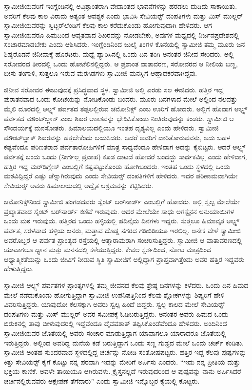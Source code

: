  ಸ್ವಾಮೀಜಿಯವರಿಗೆ ಇಂಗ್ಲೆಂಡಿನಲ್ಲಿ ಅವಿಶ್ರಾಂತರಾಗಿ ವೇದಾಂತದ ಭಾವನೆಗಳನ್ನು ಹರಡಲು ದುಡಿದು ಸಾಕಾಯಿತು. ಅವರಿಗೆ ಕೆಲವು ಕಾಲ ವಿರಾಮ ಅತ್ಯಂತ ಆವಶ್ಯಕ ಎಂದು ಭಾವಿಸಿ ಸೇವಿಯರ್ಸ್‍‍ ದಂಪತಿಗಳು ಮತ್ತು ಮಿಸ್ ಮುಲ್ಲರ್ ಸ್ವಾಮೀಜಿಯವರನ್ನು ಸ್ವಿಟ್ಜರ್‌ಲೆಂಡಿಗೆ ಕೆಲವು ಕಾಲ ಕರೆದುಕೊಂಡು ಹೋಗುವುದಾಗಿ ಹೇಳಿದರು. ಆಗ ಸ್ವಾಮೀಜಿಯವರೂ ಹಿಮದಿಂದ ಆವೃತವಾದ ಶಿಖರವನ್ನು ನೋಡಬೇಕು, ಅವುಗಳ ಮಧ್ಯದಲ್ಲಿ ನಿರ್ಜನಪ್ರದೇಶದಲ್ಲಿ ಸಂಚಾರಮಾಡಬೇಕು ಎಂದು ಆಶಿಸಿದರು. ಇಂಗ್ಲೆಂಡಿನಿಂದ ಜುಲೈ ತಿಂಗಳ ಕೊನೆಯಲ್ಲಿ ಸ್ವಾಮೀಜಿ ತಮ್ಮ ಮೂರು ಜನ ಶಿಷ್ಯರೊಡನೆ ಜಿನೀವಾಕ್ಕೆ ಹೊರಟರು. ಮಧ್ಯೆ ಪ್ಯಾರಿಸಿನಲ್ಲಿ ಒಂದು ದಿನ ತಂಗಿ ಅನಂತರ ಜಿನೀವ ಸೇರಿದರು. ಅಲ್ಲಿ ಸರೋವರದ ತೀರದಲ್ಲಿ ಒಂದು ಹೋಟೆಲಿನಲ್ಲಿದ್ದರು. ಆ ಪ್ರಶಾಂತ ವಾತಾವರಣ, ಸರೋವರದ ಆ ನೀಲಿಯ ಬಣ್ಣ, ಬೀಸು ತಂಗಾಳಿ, ಸುತ್ತಲೂ ಇರುವ ಮರಗಿಡಗಳು ಸ್ವಾಮೀಜಿ ಮನಸ್ಸಿಗೆ ಆಹ್ಲಾದಕರವಾಗಿದ್ದವು. 

 ಜಿನೀವ ಸರೋವರ ಈಜುವುದಕ್ಕೆ ಪ್ರಸಿದ್ಧವಾದ ಸ್ಥಳ. ಸ್ವಾಮೀಜಿ ಅಲ್ಲಿ ಎರಡು ಸಲ ಈಜಿದರು. ಹತ್ತಿರ ಇದ್ದ ಪುರಾತನವಾದ ಒಂದು ಕೋಟೆಯನ್ನು ನೋಡಿಕೊಂಡು ಬಂದರು. ಮೂರು ದಿನಗಳಾದ ಮೇಲೆ ಅಲ್ಲಿಂದ ನಲವತ್ತು ಮೈಲಿ ದೂರದಲ್ಲಿ ಆಲ್ಫ್ಸ್ ಪರ್ವತದ ತಪ್ಪಲಲ್ಲಿರುವ ಚಮೋನಿಕ್ಸ್ ಎಂಬ ಊರಿಗೆ ಹೋದರು. ಅಲ್ಲಿಗೆ ಹೊದಾಗ ಆಲ್ಫ್ಸ್ ಪರ್ವತದ ಮೌಂಟ್‍ಬ್ಲಾಕ್ ಎಂಬ ಶಿಖರ ಆಕಾಶವನ್ನು ಭೇದಿಸಿಕೊಂಡು ನಿಂತಿರುವುದನ್ನು ಕಂಡರು. ಸ್ವಾಮೀಜಿ ಆ ಸೌಂದರ್ಯಕ್ಕೆ ಮನಸೋತರು. ಹಿಮಾಲಯದಲ್ಲಿಯೂ ಇಂತಹ ದೃಶ್ಯವಿಲ್ಲ ಎಂದು ಹೇಳಿದರು. ಸ್ವಾಮೀಜಿ ಮೌಂಟ್‍ಬ್ಲಾಕ್ ಶಿಖರವನ್ನು ಹತ್ತಬೇಕೆಂದು ಬಯಸಿದರು. ಆದರೆ ಅವರಿಗೆ ದಾರಿತೋರುವವನು, ಅದು ಬಹಳ ಕಷ್ಟವೆಂದೂ ಪರಿಣತರಾದ ಪರ್ವತಾರೋಹಿಗಳಿಗೆ ಮಾತ್ರ ಸಾಧ್ಯವೆಂದೂ ಹೇಳಿದಾಗ ಅದನ್ನು ಕೈಬಿಟ್ಟರು. ಆದರೆ ಆಲ್ಫ್ಸ್ ಪರ್ವತಕ್ಕೆ ಬಂದು ಒಂದು (ನೀರ್ಗಲ್ಲ ಪ್ರವಾಹ) ಕೂಡ ದಾಟದೆ ಹೋದರೆ ಬಂದದ್ದು ಸಾರ್ಥಕವಿಲ್ಲ ಎಂದು ಹೇಳಿದಾಗ, ಹತ್ತಿರ ಇದ್ದ ಮರ್‌ಡಿಗ್ಲೇಸ್ ಎಂಬಲ್ಲಿಗೆ ಕಷ್ಟಪಟ್ಟುಕೊಂಡು ಹೋಗಿಬಂದರು. ಇಂತಹ ಒಂದು ಸ್ಥಳದಲ್ಲಿ ಒಂದು ಮಠವಿದ್ದಿದ್ದರೆ ಎಷ್ಟು ಚೆನ್ನಾಗಿರುವುದು ಎಂದು ಸೇವಿಯರ್ಸ್‍‍ ದಂಪತಿಗಳಿಗೆ ಹೇಳಿದರು. ಇದರ ಪರಿಣಾಮವಾಗಿಯೇ ಸೇವಿಯರ್ಸ್‍‍ ಅವರು ಹಿಮಾಲಯದಲ್ಲಿ ಅದ್ವೈತ ಆಶ್ರಮವನ್ನು ಕಟ್ಟಿಸಿದರು. 

 ಚಮೋನಿಕ್ಸ್‌ನಿಂದ ಸ್ವಾಮೀಜಿ ಪಂಗಡದವರು ಸೈಂಟ್ ಬರ್‌ನಾರ್ಡ್ ಎಂಬಲ್ಲಿಗೆ ಹೋದರು. ಅಲ್ಲಿ ಸ್ವಲ್ಪ ಮೇಲೆಯೇ ಪ್ರಖ್ಯಾತವಾದ ಸೈಂಟ್ ಬರ್‌ನಾರ್ಡ್ ಕಣಿವೆ ಇರುವುದು. ಅದರ ಮೇಲೆಯೇ ಸಾಧು ಅಗಸ್ಟೈನನ ಅನುಯಾಯಿಗಳ ಒಂದು ಮಠ ಇರುವುದು. ಹತ್ತಿರದ ಒಂದು ಹಳ್ಳಿಯಲ್ಲಿ ಹದಿನೈದು ದಿನಗಳು ಇದ್ದರು. ಸುತ್ತಲೂ ಹಿಮಾವೃತ ಆಲ್ಫ್ಸ್ ಪರ್ವತ, ಸರಳವಾದ ಹಳ್ಳಿಯ ಜನರು, ಮತ್ತಾವ ದೊಡ್ಡ ನಗರದ ಗಡಿಬಿಡಿಯೂ ಇರಲಿಲ್ಲ. ಅನೇಕ ವೇಳೆ ಸ್ವಾಮೀಜಿ ಅವರೊಬ್ಬರೆ ಆ ಪರ್ವತ ಪ್ರಾಂತ್ಯದ ರಸ್ತೆಯಲ್ಲಿ ಆತ್ಮಾರಾಮರಾಗಿ ಸಂಚರಿಸುತ್ತಿದ್ದರು. ಸ್ವಾಮೀಜಿ ಆ ವಾತಾವರಣದಲ್ಲಿ ಯಾವಾಗಲೂ ಧ್ಯಾನ ಮತ್ತು ಮನನದಲ್ಲಿ ಕಳೆಯುತ್ತಿದ್ದರು. ಕೇವಲ ಸ್ಪರ್ಶದಿಂದ, ನೋಟ ಮಾತ್ರದಿಂದ ಆಧ್ಯಾತ್ಮಿಕತೆಯನ್ನು ಒಂದು ಜೀವಿಗೆ ನೀಡುವ ಸ್ಥಿತಿ ಸ್ವಾಮೀಜಿಗೆ ಅಲ್ಲಿದ್ದಾಗ ಪ್ರಾಪ್ತವಾಗಿತ್ತೆಂದು ಅವರ ಹತ್ತಿರ ಇದ್ದವರು ಹೇಳುತ್ತಿದ್ದರು. 

 ಸ್ವಾಮೀಜಿ ಆಲ್ಫ್ಸ್ ಪರ್ವತಗಳ ಪ್ರಾಂತ್ಯಗಳಲ್ಲಿ ತಮ್ಮ ಜೀವನದ ಕೆಲವು ಶ್ರೇಷ್ಠ ದಿನಗಳನ್ನು ಕಳೆದರು. ಒಂದು ದಿನ ಹಿಮದ ಮೇಲೆ ನಡೆದುಕೊಂಡು ಹೋಗುತ್ತಿದ್ದಾಗ ಸ್ವಾಮೀಜಿ ಉಪನಿಷತ್ತಿನಿಂದ ಕೆಲವು ಶ್ಲೋಕಗಳನ್ನು ಶಿಷ್ಯರಿಗೆ ಹೇಳಿ ವಿವರಿಸುತ್ತಿದ್ದರು. ಯಾವುದೋ ಕೆಲಸಕ್ಕಾಗಿ ಅವರು ಸ್ವಲ್ಪ ಹಿಂದೆ ಬಿದ್ದರು. ಸ್ವಲ್ಪ ಕಾಲದ ಮೇಲೆ ಸೇವಿಯರ್ಸ್‍‍ ದಂಪತಿಗಳು ಮತ್ತು ಮಿಸ್ ಮುಲ್ಲರ್ ಅವರ ಸಮೀಪಕ್ಕೆ ಓಡಿಬರುತ್ತಿದ್ದರು. ಅನಂತರ ಅವರು ಹಿಮದ ಒಂದು ಬಿರುಕಿನಲ್ಲಿ ತಾವು ಬೀಳುವುದರಲ್ಲಿ ಇದ್ದೆವೆಂದೂ ದೈವವಶಾತ್ ತಪ್ಪಿಸಿಕೊಂಡೆವೆಂದೂ ಹೇಳಿದರು. ಅಂದಿನಿಂದ ಸ್ವಾಮೀಜಿಯವರ ಜೊತೆಯಲ್ಲಿ ಅವರು ಸಂಚಾರ ಮಾಡುತ್ತಿದ್ದಾಗ ಯಾವಾಗಲೂ ಯಾರಾದರೂ ಜೊತೆಯಲ್ಲಿ ಇರುತ್ತಿದ್ದರು. ಅಲ್ಲಿಂದ ಅವರಿದ್ದ ಮನೆಯ ಕಡೆ ಬರುತ್ತಿದ್ದಾಗ ಒಂದು ಸಣ್ಣ ಗುಡ್ಡದ ಮೇಲೆ ಒಂದು ಚರ್ಚ್ ಕಂಡಿತು. ಸ್ವಾಮೀಜಿ ಅಂತಹ ಸುಂದರವಾದ ಸ್ಥಳದಲ್ಲಿದ್ದ ಚರ್ಚನ್ನು ನೋಡಿ ಸಂತೋಷಪಟ್ಟರು. ಹತ್ತಿರ ಇದ್ದ ಕೆಲವು ಪುಷ್ಪಗಳನ್ನು ಕಿತ್ತು ಸೇವಿಯರ್ಸ್‍‍ ಕೈಗೆ ಕೊಟ್ಟು ನನ್ನ ಪರವಾಗಿ ಇದನ್ನು ಮೇರಿಗೆ ಅರ್ಪಿಸು ಎಂದರು. “ಇದು ನನ್ನ ಪ್ರೀತಿಯ ಮತ್ತು ಭಕ್ತಿಯ ಕಾಣಿಕೆ. ಅವಳೇ ತಾಯಿಯೂ ಆಗಿರುವಳು. ಕ್ರೈಸ್ತನಲ್ಲದೆ ಇರುವುದರಿಂದ ಆ ಪುಷ್ಪವನ್ನು ನಾನು ಅರ್ಪಿಸಿದರೆ ಚರ್ಚಿನಲ್ಲಿರುವವರು ಆಕ್ಷೇಪಣೆ ತೆಗೆದಾರು” ಎಂದು ಸ್ವಾಮೀಜಿ ಇನ್ನೊಬ್ಬರ ಕೈಯಲ್ಲಿ ಕೊಟ್ಟರು. 

